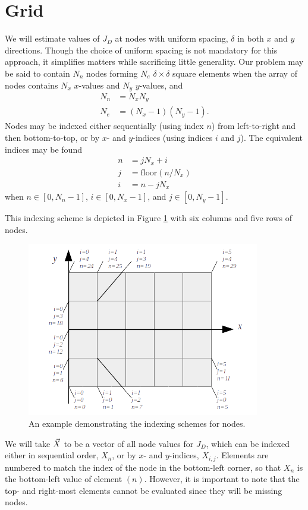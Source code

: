 \section{Grid}\label{sec:grid}

We will estimate values of $J_D$ at nodes with uniform spacing, $\delta$ in both $x$ and $y$ directions.  Though the choice of uniform spacing is not mandatory for this approach, it simplifies matters while sacrificing little generality.  Our problem may be said to contain $N_n$ nodes forming $N_e$ $\delta\times \delta$ square elements when the array of nodes contains $N_x$ $x$-values and $N_y$ $y$-values, and
\begin{align}
N_n &= N_x N_y\\
N_e &= (N_x -1)(N_y -1).
\end{align}
Nodes may be indexed either sequentially (using index $n$) from left-to-right and then bottom-to-top, or by $x$- and $y$-indices (using indices $i$ and $j$).  The equivalent indices may be found
\begin{align}
n &= jN_x + i\\
j &= \mathrm{floor}(n/N_x)\\
i &= n - jN_x
\end{align}
when $n \in [0, N_n-1]$, $i \in [0, N_x-1]$, and $j \in [0, N_y-1]$.  

This indexing scheme is depicted in Figure \ref{fig:indexing} with six columns and five rows of nodes.
\begin{figure}
\begin{center}
\includegraphics{indexing}
\caption{An example demonstrating the indexing schemes for nodes.}\label{fig:indexing}
\end{center}
\end{figure}

We will take $\vec{X}$ to be a vector of all node values for $J_D$, which can be indexed either in sequential order, $X_n$, or by $x$- and $y$-indices, $X_{i,j}$.  Elements are numbered to match the index of the node in the bottom-left corner, so that $X_n$ is the bottom-left value of element $(n)$.  However, it is important to note that the top- and right-most elements cannot be evaluated since they will be missing nodes.

